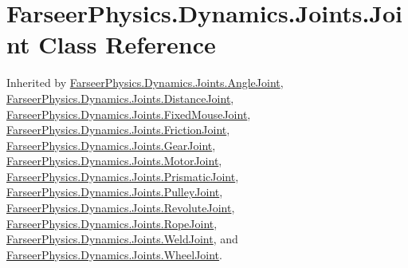 \hypertarget{class_farseer_physics_1_1_dynamics_1_1_joints_1_1_joint}{\section{Farseer\+Physics.\+Dynamics.\+Joints.\+Joint Class Reference}
\label{class_farseer_physics_1_1_dynamics_1_1_joints_1_1_joint}
}


Inherited by \hyperlink{class_farseer_physics_1_1_dynamics_1_1_joints_1_1_angle_joint}{Farseer\+Physics.\+Dynamics.\+Joints.\+Angle\+Joint}, \hyperlink{class_farseer_physics_1_1_dynamics_1_1_joints_1_1_distance_joint}{Farseer\+Physics.\+Dynamics.\+Joints.\+Distance\+Joint}, \hyperlink{class_farseer_physics_1_1_dynamics_1_1_joints_1_1_fixed_mouse_joint}{Farseer\+Physics.\+Dynamics.\+Joints.\+Fixed\+Mouse\+Joint}, \hyperlink{class_farseer_physics_1_1_dynamics_1_1_joints_1_1_friction_joint}{Farseer\+Physics.\+Dynamics.\+Joints.\+Friction\+Joint}, \hyperlink{class_farseer_physics_1_1_dynamics_1_1_joints_1_1_gear_joint}{Farseer\+Physics.\+Dynamics.\+Joints.\+Gear\+Joint}, \hyperlink{class_farseer_physics_1_1_dynamics_1_1_joints_1_1_motor_joint}{Farseer\+Physics.\+Dynamics.\+Joints.\+Motor\+Joint}, \hyperlink{class_farseer_physics_1_1_dynamics_1_1_joints_1_1_prismatic_joint}{Farseer\+Physics.\+Dynamics.\+Joints.\+Prismatic\+Joint}, \hyperlink{class_farseer_physics_1_1_dynamics_1_1_joints_1_1_pulley_joint}{Farseer\+Physics.\+Dynamics.\+Joints.\+Pulley\+Joint}, \hyperlink{class_farseer_physics_1_1_dynamics_1_1_joints_1_1_revolute_joint}{Farseer\+Physics.\+Dynamics.\+Joints.\+Revolute\+Joint}, \hyperlink{class_farseer_physics_1_1_dynamics_1_1_joints_1_1_rope_joint}{Farseer\+Physics.\+Dynamics.\+Joints.\+Rope\+Joint}, \hyperlink{class_farseer_physics_1_1_dynamics_1_1_joints_1_1_weld_joint}{Farseer\+Physics.\+Dynamics.\+Joints.\+Weld\+Joint}, and \hyperlink{class_farseer_physics_1_1_dynamics_1_1_joints_1_1_wheel_joint}{Farseer\+Physics.\+Dynamics.\+Joints.\+Wheel\+Joint}.

